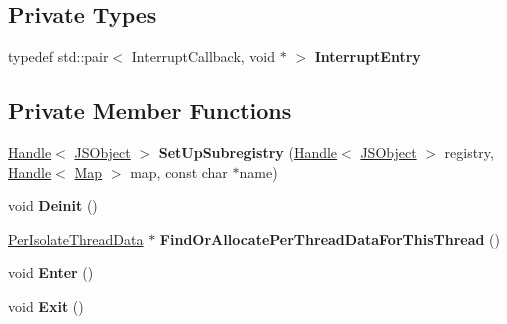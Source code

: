 \subsection*{Private Types}
\begin{DoxyCompactItemize}
\item 
typedef std\+::pair$<$ Interrupt\+Callback, void $\ast$ $>$ {\bfseries Interrupt\+Entry}\hypertarget{classv8_1_1internal_1_1_isolate_a317de5e956ade05a5118c06c68b90aa7}{}\label{classv8_1_1internal_1_1_isolate_a317de5e956ade05a5118c06c68b90aa7}

\end{DoxyCompactItemize}
\subsection*{Private Member Functions}
\begin{DoxyCompactItemize}
\item 
\hyperlink{classv8_1_1internal_1_1_handle}{Handle}$<$ \hyperlink{classv8_1_1internal_1_1_j_s_object}{J\+S\+Object} $>$ {\bfseries Set\+Up\+Subregistry} (\hyperlink{classv8_1_1internal_1_1_handle}{Handle}$<$ \hyperlink{classv8_1_1internal_1_1_j_s_object}{J\+S\+Object} $>$ registry, \hyperlink{classv8_1_1internal_1_1_handle}{Handle}$<$ \hyperlink{classv8_1_1internal_1_1_map}{Map} $>$ map, const char $\ast$name)\hypertarget{classv8_1_1internal_1_1_isolate_a5ac786f00041872b7c96b2b1f2d84b66}{}\label{classv8_1_1internal_1_1_isolate_a5ac786f00041872b7c96b2b1f2d84b66}

\item 
void {\bfseries Deinit} ()\hypertarget{classv8_1_1internal_1_1_isolate_aaff78230b7572f4f4c179edc080a3ec9}{}\label{classv8_1_1internal_1_1_isolate_aaff78230b7572f4f4c179edc080a3ec9}

\item 
\hyperlink{classv8_1_1internal_1_1_isolate_1_1_per_isolate_thread_data}{Per\+Isolate\+Thread\+Data} $\ast$ {\bfseries Find\+Or\+Allocate\+Per\+Thread\+Data\+For\+This\+Thread} ()\hypertarget{classv8_1_1internal_1_1_isolate_a9529aee078466211c6f7582405c9247a}{}\label{classv8_1_1internal_1_1_isolate_a9529aee078466211c6f7582405c9247a}

\item 
void {\bfseries Enter} ()\hypertarget{classv8_1_1internal_1_1_isolate_adf00545d4013e63407469f2150cdf3ae}{}\label{classv8_1_1internal_1_1_isolate_adf00545d4013e63407469f2150cdf3ae}

\item 
void {\bfseries Exit} ()\hypertarget{classv8_1_1internal_1_1_isolate_af1aa4087b9ee9f478f8b948708e781d2}{}\label{classv8_1_1internal_1_1_isolate_af1aa4087b9ee9f478f8b948708e781d2}


\end{DoxyCompactItemize}
